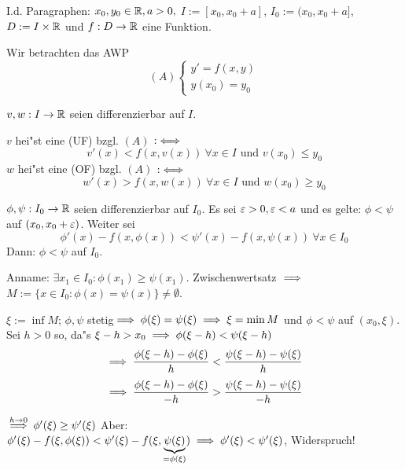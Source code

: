 \documentclass[a4paper,twoside,DIV15,BCOR12mm]{scrbook}
\begin{document}
\begin{vereinbarung}
I.d. Paragraphen: $x_0, y_0\in\mathbb{R}, a>0,$ \mbox{$I:=[x_0, x_0+a]$}, \mbox{$I_0:=(x_0, x_0+a]$}, 
$D:=I\times \mathbb{R}$ und $f:D\to\mathbb{R}$ eine Funktion.
\end{vereinbarung}

Wir betrachten das AWP
\[
	(A)\begin{cases}
		y'=f(x,y)\\
		y(x_0)=y_0
	\end{cases}
\]

\begin{definition}
$v,w:I\to\mathbb{R}$ seien differenzierbar auf $I$.

$v$ hei"st eine  (UF) bzgl. $(A)$ $:\iff$
\[
	v'(x)<f(x,v(x))\ \forall x\in I\text{ und }v(x_0)\le y_0
\]
$w$ hei"st eine  (OF) bzgl. $(A)$ $:\iff$
\[
	w'(x)>f(x,w(x))\ \forall x\in I\text{ und }w(x_0)\ge y_0
\]
\end{definition}

\begin{wichtigerhilfssatz}
$\phi,\psi:I_0\to\mathbb{R}$ seien differenzierbar auf $I_0$. Es sei $\varepsilon>0,\varepsilon<a$ und es gelte: $\phi<\psi$ auf $(x_0, x_0+\varepsilon)$.
Weiter sei
\[
	\phi'(x)-f(x,\phi(x)) < \psi'(x)-f(x,\psi(x))\ \forall x\in I_0
\]
Dann: $\phi<\psi$ auf $I_0$.
\end{wichtigerhilfssatz}
\begin{beweis}
Anname: $\exists x_1\in I_0: \phi(x_1)\ge \psi(x_1)$.
Zwischenwertsatz $\implies$ \mbox{$M:=\{x\in I_0: \phi(x)=\psi(x)\}\ne\emptyset$.}

$\xi:=\inf M$; $\phi,\psi$ stetig$\implies \phi(\xi)=\psi(\xi)\implies\xi=\min M$ und $\phi<\psi$ auf $(x_0,\xi)$.
Sei $h>0$ so, da"s $\xi-h>x_0\implies\phi(\xi-h)<\psi(\xi-h)$
\[
	\implies
	\frac{\phi(\xi-h)-\phi(\xi)}{h}<\frac{\psi(\xi-h)-\psi(\xi)}{h}
\]
\[
	\implies 
	\frac{\phi(\xi-h)-\phi(\xi)}{-h}>\frac{\psi(\xi-h)-\psi(\xi)}{-h}
\]

$\overset{h\to 0}{\implies} \phi'(\xi)\ge\psi'(\xi)$
Aber: $\phi'(\xi)-f(\xi,\phi(\xi)) < \psi'(\xi)-f(\xi,\underbrace{\psi(\xi)}_{=\phi(\xi)})
\implies \phi'(\xi)<\psi'(\xi)$, Widerspruch!
\end{beweis}
\end{document}
